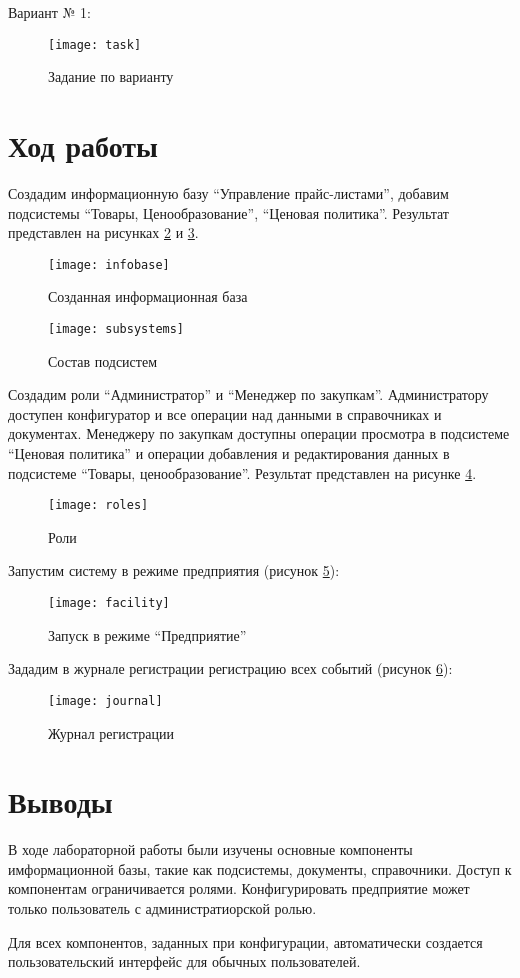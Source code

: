 \documentclass[a4paper,14pt]{extarticle}
\begin{document}
Вариант № 1:
\begin{figure}[H]
    \centering
    \texttt{[image: task]}
    \caption{Задание по варианту}
    \label{fig:task}
\end{figure}

\section{Ход работы}
Создадим информационную базу \enquote{Управление прайс-листами}, добавим
подсистемы \enquote{Товары, Ценообразование}, \enquote{Ценовая политика}.
Результат представлен на рисунках \ref{fig:infobase} и \ref{fig:subsystems}.
\begin{figure}[H]
    \centering
    \texttt{[image: infobase]}
    \caption{Созданная информационная база}
    \label{fig:infobase}
\end{figure}
\begin{figure}[H]
    \centering
    \texttt{[image: subsystems]}
    \caption{Состав подсистем}
    \label{fig:subsystems}
\end{figure}

Создадим роли \enquote{Администратор} и \enquote{Менеджер по закупкам}.
Администратору доступен конфигуратор и все операции над данными в справочниках и
документах. Менеджеру по закупкам доступны операции просмотра в подсистеме
\enquote{Ценовая политика} и операции добавления и редактирования данных в
подсистеме \enquote{Товары, ценообразование}. Результат представлен на рисунке
\ref{fig:roles}.
\begin{figure}[H]
    \centering
    \texttt{[image: roles]}
    \caption{Роли}
    \label{fig:roles}
\end{figure}

Запустим систему в режиме предприятия (рисунок \ref{fig:facility}):
\begin{figure}[H]
    \centering
    \texttt{[image: facility]}
    \caption{Запуск в режиме \enquote{Предприятие}}
    \label{fig:facility}
\end{figure}

Зададим в журнале регистрации регистрацию всех событий (рисунок
\ref{fig:journal}):
\begin{figure}[H]
    \centering
    \texttt{[image: journal]}
    \caption{Журнал регистрации}
    \label{fig:journal}
\end{figure}

\section*{Выводы}
В ходе лабораторной работы были изучены основные компоненты имформационной базы,
такие как подсистемы, документы, справочники. Доступ к компонентам
ограничивается ролями. Конфигурировать предприятие может только пользователь с
администратиорской ролью.

Для всех компонентов, заданных при конфигурации, автоматически создается
пользовательский интерфейс для обычных пользователей.
\end{document}

